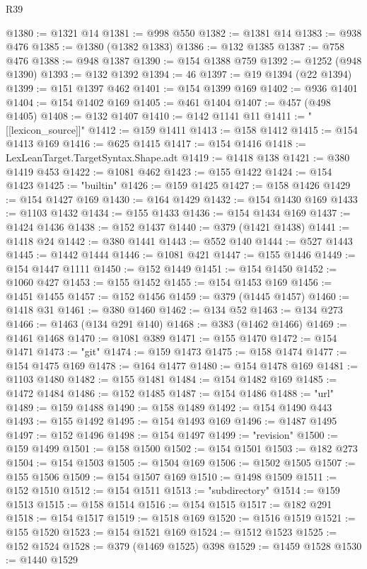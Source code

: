 \begin{lexlean}{R39}
\begin{coremodule}
@1380 := @1321 @14
@1381 := @998 @550
@1382 := @1381 @14
@1383 := @938 @476
@1385 := @1380 (@1382 @1383)
@1386 := @132 @1385
@1387 := @758 @476
@1388 := @948 @1387
@1390 := @154 @1388 @759
@1392 := @1252 (@948 @1390)
@1393 := @132 @1392
@1394 := 46
@1397 := @19 @1394 (@22 @1394)
@1399 := @151 @1397 @462
@1401 := @154 @1399 @169
@1402 := @936 @1401
@1404 := @154 @1402 @169
@1405 := @461 @1404
@1407 := @457 (@498 @1405)
@1408 := @132 @1407
@1410 := @142 @1141 @11
@1411 := "[[lexicon_source]]"
@1412 := @159 @1411
@1413 := @158 @1412
@1415 := @154 @1413 @169
@1416 := @625 @1415
@1417 := @154 @1416
@1418 := LexLeanTarget.TargetSyntax.Shape.adt
@1419 := @1418 @138
@1421 := @380 @1419 @453
@1422 := @1081 @462
@1423 := @155 @1422
@1424 := @154 @1423
@1425 := "builtin"
@1426 := @159 @1425
@1427 := @158 @1426
@1429 := @154 @1427 @169
@1430 := @164 @1429
@1432 := @154 @1430 @169
@1433 := @1103 @1432
@1434 := @155 @1433
@1436 := @154 @1434 @169
@1437 := @1424 @1436
@1438 := @152 @1437
@1440 := @379 (@1421 @1438)
@1441 := @1418 @24
@1442 := @380 @1441
@1443 := @552 @140
@1444 := @527 @1443
@1445 := @1442 @1444
@1446 := @1081 @421
@1447 := @155 @1446
@1449 := @154 @1447 @1111
@1450 := @152 @1449
@1451 := @154 @1450
@1452 := @1060 @427
@1453 := @155 @1452
@1455 := @154 @1453 @169
@1456 := @1451 @1455
@1457 := @152 @1456
@1459 := @379 (@1445 @1457)
@1460 := @1418 @31
@1461 := @380 @1460
@1462 := @134 @52
@1463 := @134 @273
@1466 := @1463 (@134 @291 @140)
@1468 := @383 (@1462 @1466)
@1469 := @1461 @1468
@1470 := @1081 @389
@1471 := @155 @1470
@1472 := @154 @1471
@1473 := "git"
@1474 := @159 @1473
@1475 := @158 @1474
@1477 := @154 @1475 @169
@1478 := @164 @1477
@1480 := @154 @1478 @169
@1481 := @1103 @1480
@1482 := @155 @1481
@1484 := @154 @1482 @169
@1485 := @1472 @1484
@1486 := @152 @1485
@1487 := @154 @1486
@1488 := "url"
@1489 := @159 @1488
@1490 := @158 @1489
@1492 := @154 @1490 @443
@1493 := @155 @1492
@1495 := @154 @1493 @169
@1496 := @1487 @1495
@1497 := @152 @1496
@1498 := @154 @1497
@1499 := "revision"
@1500 := @159 @1499
@1501 := @158 @1500
@1502 := @154 @1501
@1503 := @182 @273
@1504 := @154 @1503
@1505 := @1504 @169
@1506 := @1502 @1505
@1507 := @155 @1506
@1509 := @154 @1507 @169
@1510 := @1498 @1509
@1511 := @152 @1510
@1512 := @154 @1511
@1513 := "subdirectory"
@1514 := @159 @1513
@1515 := @158 @1514
@1516 := @154 @1515
@1517 := @182 @291
@1518 := @154 @1517
@1519 := @1518 @169
@1520 := @1516 @1519
@1521 := @155 @1520
@1523 := @154 @1521 @169
@1524 := @1512 @1523
@1525 := @152 @1524
@1528 := @379 (@1469 @1525) @398
@1529 := @1459 @1528
@1530 := @1440 @1529

\end{coremodule}
\end{lexlean}
